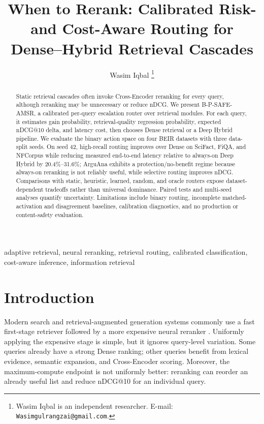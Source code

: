\documentclass[10pt,journal]{IEEEtran}
\title{When to Rerank: Calibrated Risk- and Cost-Aware Routing for Dense--Hybrid Retrieval Cascades}
\author{Wasim Iqbal%
\thanks{Wasim Iqbal is an independent researcher. E-mail: \texttt{Wasimgulrangzai@gmail.com}.}}
\makeatletter
\newcommand{\ndcg}{nDCG@10}
\makeatother
\begin{document}
\maketitle

\begin{abstract}
Static retrieval cascades often invoke Cross-Encoder reranking for every query, although reranking may be unnecessary or reduce nDCG. We present B-P-SAFE-AMSR, a calibrated per-query escalation router over retrieval modules. For each query, it estimates gain probability, retrieval-quality regression probability, expected nDCG@10 delta, and latency cost, then chooses Dense retrieval or a Deep Hybrid pipeline. We evaluate the binary action space on four BEIR datasets with three data-split seeds. On seed 42, high-recall routing improves over Dense on SciFact, FiQA, and NFCorpus while reducing measured end-to-end latency relative to always-on Deep Hybrid by 20.4\%--31.6\%; ArguAna exhibits a protection/no-benefit regime because always-on reranking is not reliably useful, while selective routing improves nDCG. Comparisons with static, heuristic, learned, random, and oracle routers expose dataset-dependent tradeoffs rather than universal dominance. Paired tests and multi-seed analyses quantify uncertainty. Limitations include binary routing, incomplete matched-activation and disagreement baselines, calibration diagnostics, and no production or content-safety evaluation.
\end{abstract}

\begin{IEEEkeywords}
adaptive retrieval, neural reranking, retrieval routing, calibrated classification, cost-aware inference, information retrieval
\end{IEEEkeywords}

\section{Introduction}
\label{sec:introduction}

Modern search and retrieval-augmented generation systems commonly use a fast first-stage retriever followed by a more expensive neural reranker \cite{karpukhin2020dense,nogueira2019passage}. Uniformly applying the expensive stage is simple, but it ignores query-level variation. Some queries already have a strong Dense ranking; other queries benefit from lexical evidence, semantic expansion, and Cross-Encoder scoring. Moreover, the maximum-compute endpoint is not uniformly better: reranking can reorder an already useful list and reduce \ndcg{} for an individual query.
\end{document}
